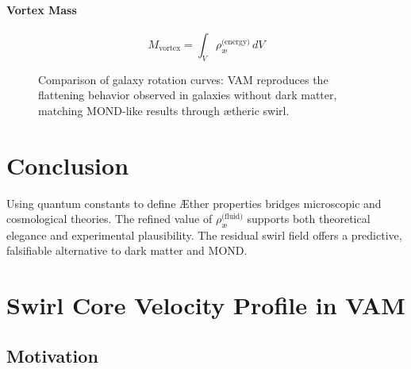 \documentclass[12pt]{article}
\begin{document}
    \paragraph{Vortex Mass}
    \[
        M_{\text{vortex}} = \int_V \rho_{\text{\ae}}^{\text{(energy)}} \, dV
    \]


    \begin{figure}[h]
        \centering
        \caption{Comparison of galaxy rotation curves: VAM reproduces the flattening behavior observed in galaxies without dark matter, matching MOND-like results through ætheric swirl.}
    \end{figure}


    \section{Conclusion}

    Using quantum constants to define \AE{}ther properties bridges microscopic and cosmological theories. The refined value of $\rho_{\text{\ae}}^{\text{(fluid)}}$ supports both theoretical elegance and experimental plausibility. The residual swirl field offers a predictive, falsifiable alternative to dark matter and MOND.


\section{Swirl Core Velocity Profile in VAM}
\label{appendix:swirl-core}

\subsection{Motivation}
\end{document}
